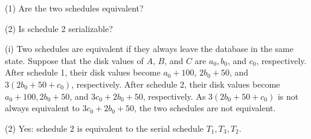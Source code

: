 (1) Are the two schedules equivalent?

(2) Is schedule 2 serializable?

\begin{sol}
     (i) Two schedules are equivalent if they always leave the database in the same state. Suppose that the disk values of $A$, $B$, and $C$ are $a_0, b_0$, and $c_0$, respectively. After schedule 1, their disk values become $a_0 + 100$, $2b_0 + 50$, and $3(2b_0 + 50 + c_0)$, respectively. After schedule 2, their disk values become $a_0 + 100, 2b_0 + 50$, and $3c_0 + 2b_0 + 50$, respectively. As $3(2b_0 + 50 + c_0)$ is not always equivalent to $3c_0 + 2b_0 + 50$, the two schedules are not equivalent.

    \vgap

    (2) Yes: schedule 2 is equivalent to the serial schedule $T_1, T_3, T_2$.
\end{sol}



